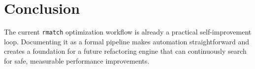 \documentclass[11pt]{article}
\begin{document}
\section{Conclusion}
The current \texttt{rmatch} optimization workflow is already a practical self-improvement loop. Documenting it as a formal pipeline makes automation straightforward and creates a foundation for a future refactoring engine that can continuously search for safe, measurable performance improvements.
\end{document}
